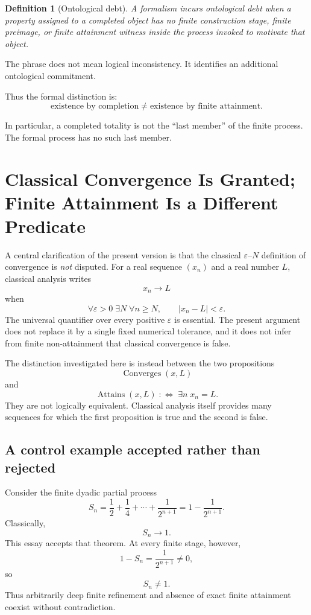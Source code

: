 \documentclass[11pt,a4paper]{article}
\newtheorem{definition}{Definition}
\begin{document}
\begin{definition}[Ontological debt]
A formalism incurs ontological debt when a property assigned to a
completed object has no finite construction stage, finite preimage, or
finite attainment witness inside the process invoked to motivate that
object.
\end{definition}

The phrase does not mean logical inconsistency. It identifies an
additional ontological commitment.

Thus the formal distinction is:
\[
\boxed{
\text{existence by completion}
\neq
\text{existence by finite attainment}.
}
\]

In particular, a completed totality is not the ``last member'' of the
finite process. The formal process has no such last member.


\section{Classical Convergence Is Granted; Finite Attainment Is a Different Predicate}
\label{sec:convergence-versus-attainment}

A central clarification of the present version is that the classical
$\varepsilon$--$N$ definition of convergence is \emph{not} disputed.
For a real sequence $(x_n)$ and a real number $L$, classical analysis
writes
\[
x_n\longrightarrow L
\]
when
\[
\forall \varepsilon>0\;
\exists N\;
\forall n\ge N,\qquad
|x_n-L|<\varepsilon.
\]
The universal quantifier over every positive $\varepsilon$ is essential.
The present argument does not replace it by a single fixed numerical
tolerance, and it does not infer from finite non-attainment that
classical convergence is false.

The distinction investigated here is instead between the two
propositions
\[
\operatorname{Converges}(x,L)
\]
and
\[
\operatorname{Attains}(x,L)
\;:\Longleftrightarrow\;
\exists n\; x_n=L.
\]
They are not logically equivalent.  Classical analysis itself provides
many sequences for which the first proposition is true and the second
is false.

\subsection{A control example accepted rather than rejected}

Consider the finite dyadic partial process
\[
S_n
=
\frac12+\frac14+\cdots+\frac{1}{2^{n+1}}
=
1-\frac{1}{2^{n+1}}.
\]
Classically,
\[
S_n\longrightarrow1.
\]
This essay accepts that theorem.  At every finite stage, however,
\[
1-S_n=\frac{1}{2^{n+1}}\neq0,
\]
so
\[
S_n\neq1.
\]
Thus arbitrarily deep finite refinement and absence of exact finite
attainment coexist without contradiction.
\end{document}
